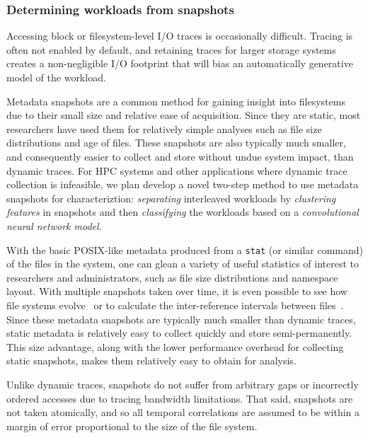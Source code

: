 \subsubsection*{Determining workloads from snapshots }

Accessing block or filesystem-level I/O traces is occasionally difficult.
Tracing is often not enabled by default, and retaining traces for larger storage
systems creates a non-negligible I/O footprint that will bias an automatically
generative model of the workload. 

Metadata snapshots are a common method for gaining insight into filesystems due
to their small size and relative ease of acquisition. Since they are static,
most researchers have used them for relatively simple analyses such as file size
distributions and age of files. These snapshots are also typically much smaller,
and consequently easier to collect and store without undue system impact, than
dynamic traces.  For HPC systems and other applications where dynamic trace
collection is infeasible, we plan develop a novel two-step method to use
metadata snapshots for characteriztion: \textit{separating} interleaved
workloads by \textit{clustering features} in snapshots and then
\textit{classifying} the workloads based on a \textit{convolutional neural
network model}.

With the basic POSIX-like metadata produced from a \texttt{stat} (or similar
command) of the files in the system, one can glean a variety of useful
statistics of interest to researchers and administrators, such as file size
distributions and namespace layout. With multiple snapshots taken over time, it
is even possible to see how file systems evolve~\cite{agrawal:fast07} or to
calculate the inter-reference intervals between files~\cite{gibson:cmg98}.
Since these metadata snapshots are typically much smaller than dynamic traces,
static metadata is relatively easy to collect quickly and store
semi-permanently. This size advantage, along with the lower performance overhead
for collecting static snapshots, makes them relatively easy to obtain for
analysis.

Unlike dynamic traces, snapshots do not
suffer from arbitrary gaps or incorrectly ordered accesses due to tracing bandwidth limitations.  That said, snapshots are not taken atomically, and so all temporal
correlations are assumed to be within a margin of error proportional to the size
of the file system. 

